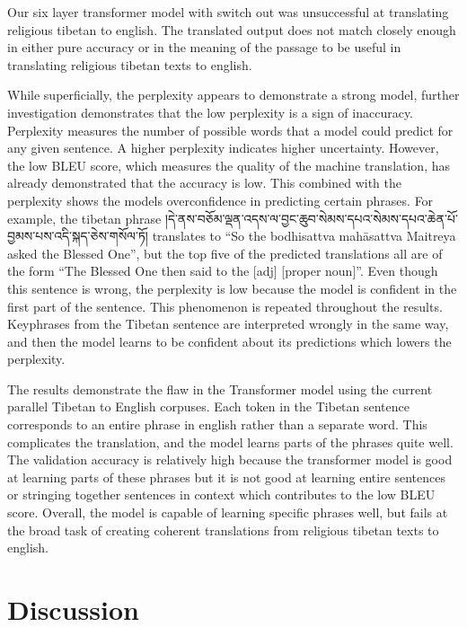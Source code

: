 \documentclass[letterpaper, 12 pt, conference]{ieeeconf}  %
\begin{document}
\par
Our six layer transformer model with switch out was unsuccessful at translating religious tibetan to english. The translated output does not match closely enough in either pure accuracy or in the meaning of the passage to be useful in translating religious tibetan texts to english. \par
While superficially, the perplexity appears to demonstrate a strong model, further investigation demonstrates that the low perplexity is a sign of inaccuracy. Perplexity measures the number of possible words that a model could predict for any given sentence. A higher perplexity indicates higher uncertainty. However, the low BLEU score, which measures the quality of the machine translation, has already demonstrated that the accuracy is low. This combined with the perplexity shows the models overconfidence in predicting certain phrases. For example, the tibetan phrase །དེ་ནས་བཅོམ་ལྡན་འདས་ལ་བྱང་ཆུབ་སེམས་དཔའ་སེམས་དཔའ་ཆེན་པོ་བྱམས་པས་འདི་སྐད་ཅེས་གསོལ་ཏོ། translates to “So the bodhisattva mahāsattva Maitreya asked the Blessed One”, but the top five of the predicted translations all are of the form “The Blessed One then said to the [adj] [proper noun]”. Even though this sentence is wrong, the perplexity is low because the model is confident in the first part of the sentence. This phenomenon is repeated throughout the results. Keyphrases from the Tibetan sentence are interpreted wrongly in the same way, and then the model learns to be confident about its predictions which lowers the perplexity. \par
The results demonstrate the flaw in the Transformer model using the current parallel Tibetan to English corpuses. Each token in the Tibetan sentence corresponds to an entire phrase in english rather than a separate word. This complicates the translation, and the model learns parts of the phrases quite well. The validation accuracy is relatively high because the transformer model is good at learning parts of these phrases but it is not good at learning entire sentences or stringing together sentences in context which contributes to the low BLEU score. Overall, the model is capable of learning specific phrases well, but fails at the broad task of creating coherent translations from religious tibetan texts to english. 


\section{Discussion}
\end{document}
